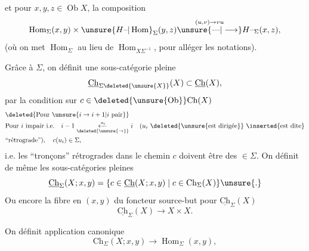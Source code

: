 et pour $x,y,z\in\operatorname{Ob}X$, la composition
\[
\operatorname{Hom}_\Sigma(x,y)\times\unsure{H\text{--}|\operatorname{Hom}}_\Sigma(y,z)\overset{(u,v)\to vu}{\unsure{\text{---}|\longrightarrow}}{H\text{--}}_{\Sigma}(x,z),
\]
(où on met $\operatorname{Hom}_\Sigma$ au lieu de $\operatorname{Hom}_{X\Sigma^{-1}}$, pour alléger les notations).

 Grâce à $\Sigma$, on définit une sous-catégorie pleine
\[
\underline{\mathrm{Ch}}_{\Sigma\deleted{\unsure{X}}}(X)\subset\underline{\mathrm{Ch}}(X),
\]
par la condition sur $c\in\deleted{\unsure{\operatorname{Ob}}}\mathrm{Ch}(X)$
\[
\begin{aligned}
&\deleted{\text{Pour }\unsure{i\to i+1|i\ \text{pair}}}\\
&\text{Pour }i\text{ impair i.e.}\quad i-1\mathrel{\underset{\deleted{\unsure{\to}}}{\xleftarrow{u_i}}}i\quad (u_i\ \deleted{\unsure{\text{est dirigée}}}\ \inserted{\text{est dite}}\\
&\text{``rétrograde''}),\quad c(u_i)\in\Sigma,
\end{aligned}
\]
i.e. les   ``tronçons'' rétrogrades dans le chemin $c$ doivent être des $\in\Sigma$. On définit de même les sous-catégories pleines
\[
\underline{\mathrm{Ch}}_\Sigma(X;x,y)=\{c\in\underline{\mathrm{Ch}}(X;x,y)\mid c\in\mathrm{Ch}_\Sigma(X)\}\unsure{.}
\]
Ou encore la fibre en $(x,y)$ du foncteur source-but pour $\underline{\mathrm{Ch}}_\Sigma(X)$
\[
\underline{\mathrm{Ch}}_\Sigma(X)\longrightarrow X\times X.
\]

On définit  application canonique
\[
\mathrm{Ch}_\Sigma(X;x,y)\longrightarrow\operatorname{Hom}_\Sigma(x,y),
\]

